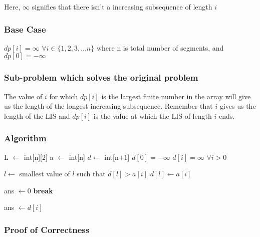 \documentclass[12pt]{article}
\begin{document}
Here, $\infty$ signifies that there isn't a increasing subsequence of length $i$

\subsubsection{Base Case}

$dp[i] = \infty $ $\forall i \in \{1, 2, 3, \dots n\}$ where n is total number of segments, and $dp[0] = -\infty$

\subsubsection{Sub-problem which solves the original problem}

The value of $i$ for which $dp[i]$ is the largest finite number in the array will give us the length of the longest increasing subsequence. Remember that $i$ gives us the length of the LIS and $dp[i]$ is the value at which the LIS of length $i$ ends.


\subsubsection{Algorithm}

\begin{algorithm}
    \begin{algorithmic}[1]
        \Require L $\leftarrow$ int[n][2] 
        \Require a $\leftarrow$ int[n] 
        \State $d \leftarrow$ int[n+1]
        \State $d[0] = -\infty$
        \State $d[i] = \infty$ $\forall i > 0$

        \State $l \leftarrow$ smallest value of $l$ such that $d[l] > a[i]$
        \State $d[l] \leftarrow a[i]$
        \EndIf

        \EndFor

        \State ans $\leftarrow 0$
        \State \textbf{break}
        \EndIf

        \State ans $\leftarrow d[i]$
        \EndFor
    \end{algorithmic}
\end{algorithm}

\subsubsection{Proof of Correctness}
\end{document}
